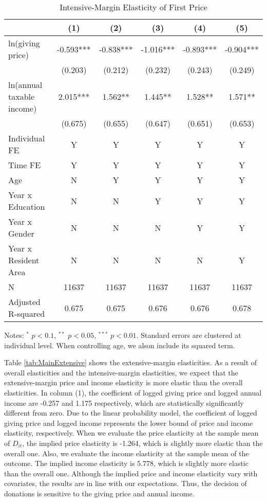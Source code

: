 \documentclass[
  11pt,
  a4paper,
]{article}
\begin{document}
\begin{table}

\caption{\label{tab:MainIntensive}Intensive-Margin Elasticity of First Price}
\centering
\fontsize{7}{9}\selectfont
\begin{threeparttable}
\begin{tabular}[t]{lccccc}
\toprule
 & (1) & (2) & (3) & (4) & (5)\\
\midrule
ln(giving price) & -0.593*** & -0.838*** & -1.016*** & -0.893*** & -0.904***\\
 & (0.203) & (0.212) & (0.232) & (0.243) & (0.249)\\
ln(annual taxable income) & 2.015*** & 1.562** & 1.445** & 1.528** & 1.571**\\
 & (0.675) & (0.655) & (0.647) & (0.651) & (0.653)\\
Individual FE & Y & Y & Y & Y & Y\\
Time FE & Y & Y & Y & Y & Y\\
Age & N & Y & Y & Y & Y\\
Year x Education & N & N & Y & Y & Y\\
Year x Gender & N & N & N & Y & Y\\
Year x Resident Area & N & N & N & N & Y\\
N & 11637 & 11637 & 11637 & 11637 & 11637\\
Adjusted R-squared & 0.675 & 0.675 & 0.676 & 0.676 & 0.678\\
\bottomrule
\end{tabular}
\begin{tablenotes}
\item Notes: $^{*}$ $p < 0.1$, $^{**}$ $p < 0.05$, $^{***}$ $p < 0.01$. Standard errors are clustered at individual level. When controlling age, we alson include its squared term.
\end{tablenotes}
\end{threeparttable}
\end{table}

Table \ref{tab:MainExtensive} shows the extensive-margin elasticities.
As a result of overall elasticities and the intensive-margin elasticities,
we expect that the extensive-margin price and income elasticity is more elastic than the overall elasticities.
In column (1), the coefficient of logged giving price and logged annual income are -0.257 and 1.175 respectively,
which are statistically significantly different from zero.
Due to the linear probability model,
the coefficient of logged giving price and logged income represents the lower bound of price and income elasticity, respectively.
When we evaluate the price elasticity at the sample mean of \(D_{it}\),
the implied price elasticity is -1.264, which is slightly more elastic than the overall one.
Also, we evaluate the income elasticity at the sample mean of the outcome.
The implied income elasticity is 5.778, which is slightly more elastic than the overall one.
Although the implied price and income elasticity vary with covariates,
the results are in line with our expectations.
Thus, the decision of donations is sensitive to the giving price and annual income.
\end{document}
